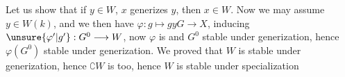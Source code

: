 Let us show that if $y\in W$, $x$ generizes $y$, then $x\in W$. Now we may assume $y\in W(k)$, and we then have $\varphi:g\longmapsto gy$\quad $G\longrightarrow X$, inducing $\unsure{\varphi'|g'}:G^0\longrightarrow W$, now $\varphi$ is  and $G^0$ stable under generization, hence $\varphi(G^0)$ stable under generization. We  proved that $W$ is stable under generization, hence $\complement W$ is too, hence $W$ is stable under specialization
